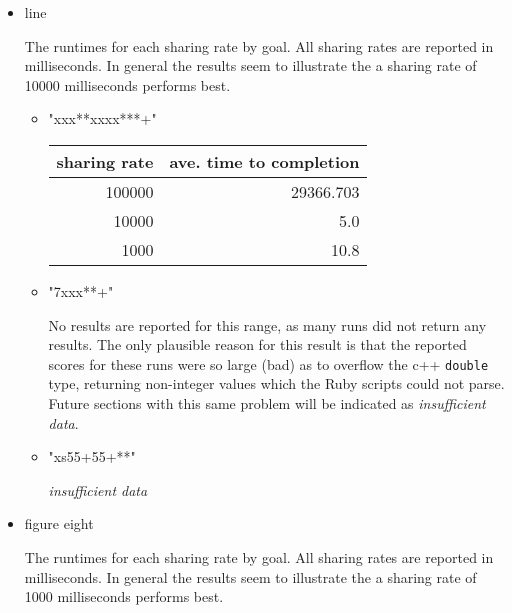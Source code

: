 \documentclass[11pt]{article}
\begin{document}
\begin{itemize}

\item line\\
\label{sec-1.5.4.1}

The runtimes for each sharing rate by goal.  All sharing rates are
reported in milliseconds.  In general the results seem to illustrate
the a sharing rate of 10000 milliseconds performs best.
\begin{itemize}

\item "xxx**xxxx***+"\\
\label{sec-1.5.4.1.1}


\begin{center}
\begin{tabular}{rr}
 sharing rate  &  ave. time to completion  \\
\hline
       100000  &                29366.703  \\
        10000  &                      5.0  \\
         1000  &                     10.8  \\
\end{tabular}
\end{center}




\item "7xxx**+"\\
\label{sec-1.5.4.1.2}

No results are reported for this range, as many runs did not return
any results.  The only plausible reason for this result is that the
reported scores for these runs were so large (bad) as to overflow the
c++ \texttt{double} type, returning non-integer values which the Ruby scripts
could not parse.  Future sections with this same problem will be
indicated as \emph{insufficient data}.


\item "xs55+55+**"\\
\label{sec-1.5.4.1.3}


 \emph{insufficient data}

\end{itemize} %

\item figure eight\\
\label{sec-1.5.4.2}

The runtimes for each sharing rate by goal.  All sharing rates are
reported in milliseconds.  In general the results seem to illustrate
the a sharing rate of 1000 milliseconds performs best.
\begin{itemize}


\end{itemize}
\end{itemize}
\end{document}
